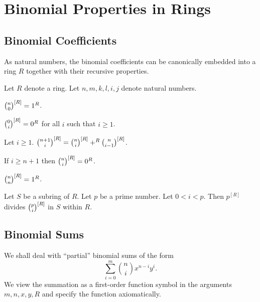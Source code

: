 \documentclass[english,11pt]{article}
\begin{document}
\section{Binomial Properties in Rings}

\subsection{Binomial Coefficients}

As natural numbers, the binomial coefficients can be 
canonically embedded 
into a ring $R$ together with their recursive properties.

\begin{forthel}

Let $R$ denote a ring.
Let $n,m,k,l,i,j$ denote natural numbers.

\begin{lemma}
${n \choose 0}^{[R]} = 1^{R}$.
\end{lemma}

\begin{lemma}
${0 \choose i}^{[R]} = 0^{R}$ for all $i$ such that $i \geq 1$.
\end{lemma}

\begin{lemma} Let $i \geq 1$.
${n+1 \choose i}^{[R]} = {n \choose i}^{[R]} +^{R} {n \choose i-1}^{[R]}$.
\end{lemma}

\begin{lemma}
If $i \geq n + 1$ then ${n \choose i}^{[R]} = 0^{R}$.
\end{lemma}

\begin{theorem} 
${n \choose n}^{[R]} = 1^{R}$.
\end{theorem}

\begin{lemma} Let $S$ be a subring of $R$.
Let $p$ be a prime number.
Let $0 < i < p$. Then
$p^{[R]}$ divides ${p \choose i}^{[R]}$ in $S$ within $R$.
\end{lemma}

\end{forthel}

\subsection{Binomial Sums}

We shall deal with ``partial'' binomial sums of the form
\[\sum_{i=0}^m {n \choose i} x^{n-i} y^{i}.\]
We view the summation as a first-order function symbol in the 
arguments $m,n,x,y,R$ and specify the function axiomatically.
\end{document}
